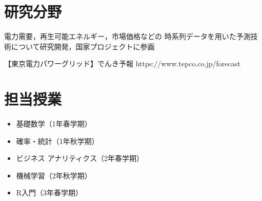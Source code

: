 \section{研究分野}

{
  電力需要，再生可能エネルギー，市場価格などの
  時系列データを用いた予測技術について研究開発，国家プロジェクトに参画\\[10mm]

}

{
  \MyRef
  {【東京電力パワーグリッド】でんき予報}
  {https://www.tepco.co.jp/forecast}
}

\section{担当授業}

{
  \begin{itemize}
    \item 基礎数学（1年春学期）
    \item  確率・統計（1年秋学期）
    \item  ビジネス アナリティクス（2年春学期）
    \item  機械学習（2年秋学期）
    \item  R入門（3年春学期）
  \end{itemize}
}


